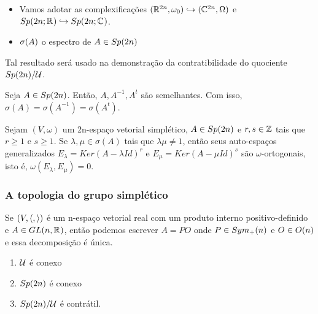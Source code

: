 \documentclass{beamer}
\begin{document}
	\begin{frame}
		\begin{itemize}
			\item Vamos adotar as complexificações $(\mathbb{R}^{2n}, \omega_{0}) \hookrightarrow (\mathbb{C}^{2n}, \Omega)$ e $Sp(2n;\mathbb{R}^{}) \hookrightarrow Sp(2n; \mathbb{C}^{})$. 
			
			\item $\sigma(A)$ o espectro de $A \in Sp(2n)$ 
		\end{itemize}	
		
		\begin{tiny}
			Tal resultado será usado na demonstração da contratibilidade do quociente $Sp(2n)/\mathcal{U}$.
			
		\end{tiny}
		\begin{lema}
			Seja $A \in Sp(2n)$. Então, $A, A^{-1}, A^{t}$ são semelhantes. Com isso, $\sigma(A) = \sigma(A^{-1}) = \sigma(A^{t}) $.
		\end{lema}
		
		
		\begin{lema}
			Sejam $(V, \omega)$ um 2n-espaço vetorial simplético, $A \in Sp(2n)$ e $r,s \in \mathbb{Z}$ tais que $r\geq 1$ e $s\geq 1$. Se $\lambda, \mu \in \sigma(A)$ tais que $\lambda\mu \neq 1$, então seus auto-espaços generalizados $E_{\lambda}=Ker(A-\lambda Id)^{r}$ e  $E_{\mu}=Ker(A-\mu Id)^{s}$ são $\omega$-ortogonais, isto é, $\omega(E_{\lambda}, E_{\mu}) = 0$.
		\end{lema}
		
	\end{frame}
	
	\begin{frame}
		\frametitle{A topologia do grupo simplético}
		
		\begin{teorema}
			Se $(V, \langle ,  \rangle)$ é um n-espaço vetorial real com um produto interno positivo-definido e $A \in GL(n, \mathbb{R}^{})$, então podemos escrever $A=PO$ onde $P \in  Sym_{+}(n)$ e $O \in O(n)$ e essa decomposição é única.
		\end{teorema}
		\begin{enumerate}
			\item $\mathcal{U}$ é conexo
			
			\item $Sp(2n)$ é conexo
			
			\item $Sp(2n)/\mathcal{U}$ é contrátil.
		\end{enumerate}
	\end{frame}
	
\end{document}
